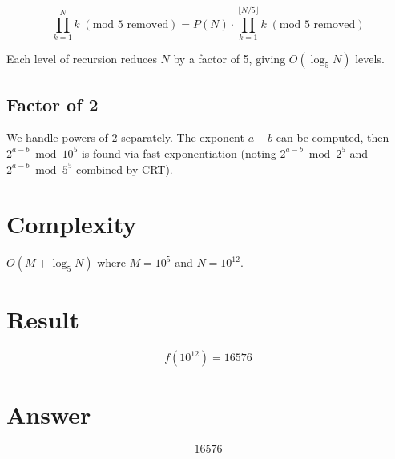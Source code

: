 \documentclass[12pt,a4paper]{article}
\begin{document}
\[
\prod_{k=1}^{N} k \;(\text{mod 5 removed}) = P(N) \cdot \prod_{k=1}^{\lfloor N/5 \rfloor} k \;(\text{mod 5 removed})
\]

Each level of recursion reduces $N$ by a factor of 5, giving $O(\log_5 N)$ levels.

\subsection{Factor of 2}

We handle powers of 2 separately. The exponent $a - b$ can be computed, then $2^{a-b} \bmod 10^5$ is found via fast exponentiation (noting $2^{a-b} \bmod 2^5$ and $2^{a-b} \bmod 5^5$ combined by CRT).

\section{Complexity}

$O(M + \log_5 N)$ where $M = 10^5$ and $N = 10^{12}$.

\section{Result}

\[
f(10^{12}) = \boxed{16576}
\]

\section{Answer}

\[
\boxed{16576}
\]
\end{document}
